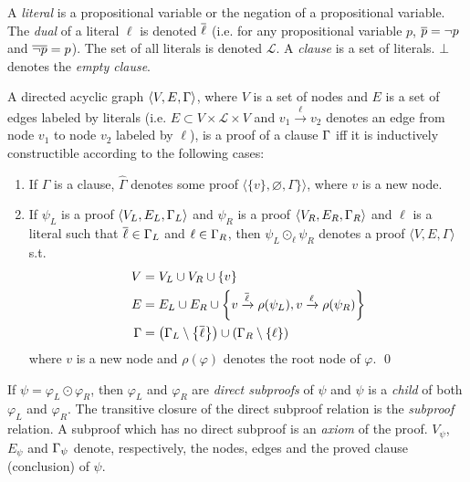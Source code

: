 \documentclass{llncs}
\begin{document}
A \emph{literal} is a propositional variable or the negation of a propositional variable. The
\emph{dual} of a literal $\ell$ is denoted $\overline{\ell}$ (i.e. for any propositional variable $p$,
$\overline{p} = \neg p$ and $\overline{\neg p} = p$). The set of all literals is denoted $\mathcal{L}$. A
\emph{clause} is a set of literals. $\bot$ denotes the \emph{empty clause}.


\newcommand{\axiom}[1]{\widehat{#1}}
\newcommand{\n}{v}
\newcommand{\raiz}[1]{\rho(#1)}

\begin{definition}[Proof] 
\label{def:proof}
A directed acyclic graph $\langle V, E, \Gamma \rangle$, where $V$ is a set of nodes and $E$ is a
set of edges labeled by literals (i.e. $E \subset V \times \mathcal{L} \times V$ and $\n_1
\xrightarrow{\ell} \n_2$ denotes an edge from node $\n_1$ to node $\n_2$ labeled by $\ell$), is a
proof of a clause $\Gamma$ iff it is inductively constructible according to the following cases:
%
\begin{enumerate}
  \item If $\Gamma$ is a clause, $\axiom{\Gamma}$ denotes some proof $\langle \{ \n \}, \varnothing,
    \Gamma \} \rangle$, where $\n$ is a new node.
  \item If $\psi_L$ is a proof $\langle V_L, E_L, \Gamma_L \rangle$ and
    $\psi_R$ is a proof $\langle V_R, E_R, \Gamma_R \rangle$ and $\ell$ is a literal such that
    $\overline{\ell} \in \Gamma_L$ and $\ell \in \Gamma_R$, then
    $\psi_L \odot_\ell \psi_R$ denotes a proof $\langle V, E, \Gamma \rangle$ s.t.
    \begin{align*}
      V &= V_L \cup V_R \cup \{\n \} \\
      E &= E_L \cup E_R \cup
                    \left\{ \n \xrightarrow{\dual{\ell}} \raiz{\psi_L}, \n \xrightarrow{\ell} \raiz{\psi_R} \right\} \\
     \Gamma &= \left( \clause_L \setminus \left\{ \dual{\ell} \right\} \right) \cup \left( \clause_R
                    \setminus \left\{ \ell \right\} \right)
    \end{align*}
    where $\n$ is a new node and $\raiz{\varphi}$ denotes the root node of $\varphi$.
  \qed
\end{enumerate}
\end{definition}


\newcommand{\Vertices}[1]{V_{#1}}
\newcommand{\Edges}[1]{E_{#1}}
\newcommand{\Conclusion}[1]{\clause_{#1}}

\noindent
If $\psi = \varphi_L \odot \varphi_R$, then $\varphi_L$ and $\varphi_R$ are \emph{direct subproofs}
of $\psi$ and $\psi$ is a \emph{child} of both $\varphi_L$ and $\varphi_R$. The transitive closure of
the direct subproof relation is the \emph{subproof} relation. A subproof which has no direct
subproof is an \emph{axiom} of the proof.
%
$\Vertices{\psi}$, $\Edges{\psi}$ and $\Conclusion{\psi}$
denote, respectively, the nodes, edges and the proved clause (conclusion) of $\psi$.
\end{document}

